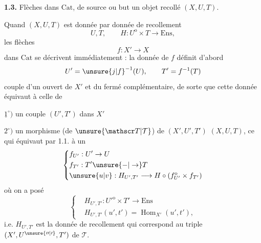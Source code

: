\textbf{1.3.}\quad {} Flèches dans $\mathrm{Cat}$, de source ou but un objet
recollé $(X,U,T)$.

Quand $(X,U,T)$ est donnée par  donnée de
recollement
\[
U,T,\qquad H:U^{\mathrm o}\times T\longrightarrow\mathrm{Ens},
\]
les  flèches
\[
f:X'\longrightarrow X
\]
dans $\mathrm{Cat}$ se décrivent immédiatement  : 
la donnée de $f$ définit d'abord
\[
U'=\unsure{j|f}^{-1}(U),\qquad T'=f^{-1}(T)
\]
couple d'un ouvert de $X'$ et du fermé complémentaire,
 de sorte que cette  donnée équivaut
à celle de

$\underline{1}^{\circ})$ un couple $(U',T')$ dans $X'$

$2^{\circ})$ un morphisme (de $\unsure{\mathscr T|\mathcal T}$) de $(X',U',T')$
 $(X,U,T)$, ce qui équivaut par 1.1.
à un 
\[
\left\{\begin{aligned}
&f_{U'}:U'\to U\\
&f_{T'}:T'\unsure{-|\to}T\\
&\unsure{u|v}:H_{U',T'}\longrightarrow H\circ(f_{U'}^{\mathrm o}\times f_{T'})
\end{aligned}\right.
\]
où on a posé
\[
\left\{\begin{aligned}
&H_{U',T'}:{U'}^{\mathrm o}\times T'\longrightarrow\mathrm{Ens}\\
&H_{U',T'}(u',t')=\operatorname{Hom}_{X'}(u',t'),
\end{aligned}\right.
\]
i.e. $H_{U',T'}$ est la donnée de recollement
qui correspond au triple $(X',U^{\unsure{\prime\prime|\prime}},T')$ de $\mathscr T$.
